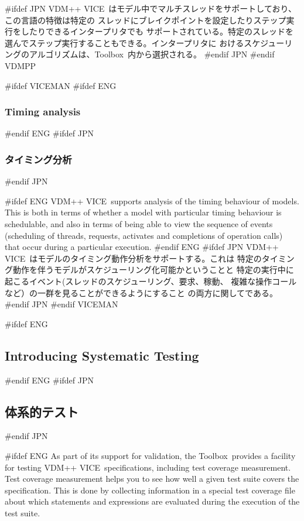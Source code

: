 \documentclass[\pformat,12pt]{article}
\newcommand{\vdmslpp}{VDM-SL}
\newcommand{\Toolbox}{Toolbox}
\newcommand{\vdmslpp}{VDM++}
\newcommand{\Toolbox}{Toolbox}
\renewcommand{\vdmslpp}{VDM++ VICE}
\begin{document}
#ifdef JPN
\vdmslpp\ はモデル中でマルチスレッドをサポートしており、この言語の特徴は特定の
スレッドにブレイクポイントを設定したりステップ実行をしたりできるインタープリタでも
サポートされている。特定のスレッドを選んでステップ実行することもできる。インタープリタに
おけるスケジューリングのアルゴリズムは、\Toolbox\ 内から選択される。
#endif JPN
#endif VDMPP

#ifdef VICEMAN
#ifdef ENG
\subsubsection{Timing analysis}
#endif ENG
#ifdef JPN
\subsubsection{タイミング分析}
#endif JPN

#ifdef ENG
\vdmslpp\ supports analysis of the timing behaviour of models. This is
both in terms of whether a model with particular timing behaviour is
schedulable, and also in terms of being able to view the sequence of
events (scheduling of threads, requests, activates and completions of
operation calls) that occur during a particular execution.
#endif ENG
#ifdef JPN
\vdmslpp\ はモデルのタイミング動作分析をサポートする。これは
特定のタイミング動作を伴うモデルがスケジューリング化可能かということと
特定の実行中に起こるイベント(スレッドのスケジューリング、要求、稼動、
複雑な操作コールなど）の一群を見ることができるようにすること
の両方に関してである。
#endif JPN
#endif VICEMAN

#ifdef ENG
\subsection{Introducing Systematic Testing}
#endif ENG
#ifdef JPN
\subsection{体系的テスト}
#endif JPN
\label{tour:testing}

#ifdef ENG
As part of its support for validation, the \Toolbox\ provides a
facility for testing \vdmslpp\ specifications, including test
  coverage measurement.  Test coverage measurement helps you to see
how well a given test suite covers the
specification. This is done by collecting information in a special
test coverage file about which statements and expressions are
evaluated during the execution of the test suite.
\end{document}
